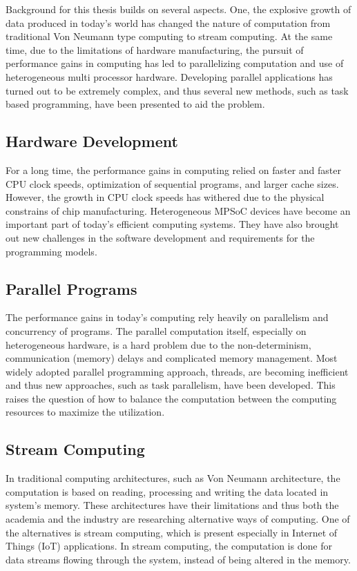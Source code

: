 Background for this thesis builds on several aspects. One, the explosive growth of data produced in today's world has changed the nature of computation from traditional Von Neumann type computing to stream computing. At the same time, due to the limitations of hardware manufacturing, the pursuit of performance gains in computing has led to parallelizing computation and use of heterogeneous multi processor hardware. Developing parallel applications has turned out to be extremely complex, and thus several new methods, such as task based programming, have been presented to aid the problem.

\subsection{Hardware Development}
For a long time, the performance gains in computing relied on faster and faster CPU clock speeds, optimization of sequential programs, and larger cache sizes. However, the growth in CPU clock speeds has withered due to the physical constrains of chip manufacturing. Heterogeneous MPSoC devices have become an important part of today's efficient computing systems. They have also brought out new challenges in the software development and requirements for the programming models.

\subsection{Parallel Programs}
The performance gains in today's computing rely heavily on parallelism and concurrency of programs. The parallel computation itself, especially on heterogeneous hardware, is a hard problem due to the non-determinism, communication (memory) delays and complicated memory management. Most widely adopted  parallel programming approach, threads, are becoming inefficient and thus new approaches, such as task parallelism, have been developed. This raises the question of how to balance the computation between the computing resources to maximize the utilization.

\subsection{Stream Computing}
In traditional computing architectures, such as Von Neumann architecture, the computation is based on reading, processing and writing the data located in system's memory. These architectures have their limitations and thus both the academia and the industry are researching alternative ways of computing. One of the alternatives is stream computing, which is present especially in Internet of Things (IoT) applications. In stream computing, the computation is done for data streams flowing through the system, instead of being altered in the memory.

